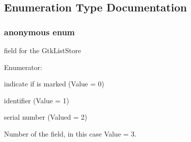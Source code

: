 \subsection{Enumeration Type Documentation}
\hypertarget{usb-gui_8c_a06fc87d81c62e9abb8790b6e5713c55b}{
\subsubsection[{"@0}]{\setlength{\rightskip}{0pt plus 5cm}anonymous enum}}
\label{usb-gui_8c_a06fc87d81c62e9abb8790b6e5713c55b}


field for the GtkListStore 

\begin{Desc}
\item[Enumerator: ]\par
\begin{description}
\item[{\em 
\hypertarget{usb-gui_8c_a06fc87d81c62e9abb8790b6e5713c55ba237841854e4e21628727932d38fdf4c5}{
COLUMN\_\-MARKED}
\label{usb-gui_8c_a06fc87d81c62e9abb8790b6e5713c55ba237841854e4e21628727932d38fdf4c5}
}]indicate if is marked (Value = 0) \item[{\em 
\hypertarget{usb-gui_8c_a06fc87d81c62e9abb8790b6e5713c55bad42963e993a0d76e1a2511cf50b17c79}{
COLUMN\_\-ID}
\label{usb-gui_8c_a06fc87d81c62e9abb8790b6e5713c55bad42963e993a0d76e1a2511cf50b17c79}
}]identifier (Value = 1) \item[{\em 
\hypertarget{usb-gui_8c_a06fc87d81c62e9abb8790b6e5713c55ba0f37881f7ff6971ea31dad00acbd4510}{
COLUMN\_\-SERIAL}
\label{usb-gui_8c_a06fc87d81c62e9abb8790b6e5713c55ba0f37881f7ff6971ea31dad00acbd4510}
}]serial number (Valued = 2) \item[{\em 
\hypertarget{usb-gui_8c_a06fc87d81c62e9abb8790b6e5713c55ba94a1900486855d9c85622e2c106104a9}{
NUM\_\-COLUMNS}
\label{usb-gui_8c_a06fc87d81c62e9abb8790b6e5713c55ba94a1900486855d9c85622e2c106104a9}
}]Number of the field, in this case Value = 3. \end{description}
\end{Desc}

